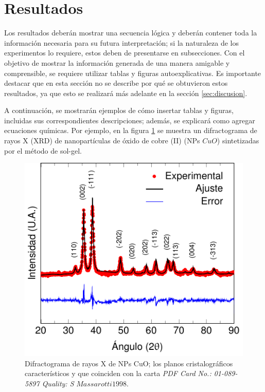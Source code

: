 \documentclass[fleqn,10pt]{SelfArx} %
\begin{document}
\section{Resultados} %
\label{sec:resultados} %

Los resultados deberán mostrar una secuencia lógica y deberán contener toda la información necesaria para su futura interpretación; si la naturaleza de los experimentos lo requiere, estos deben de presentarse en subsecciones. Con el objetivo de mostrar la información generada de una manera amigable y comprensible, se requiere utilizar tablas y figuras autoexplicativas. Es importante destacar que en esta sección no se describe por qué se obtuvieron estos resultados, ya que esto se realizará más adelante en la sección \ref{sec:discusion}.

A continuación, se mostrarán ejemplos de cómo insertar tablas y figuras, incluidas sus correspondientes descripciones; además, se explicará como agregar ecuaciones químicas. Por ejemplo, en la figura \ref{fig:xrd} se muestra un difractograma de rayos X (XRD) de nanopartículas de óxido de cobre (II) (NPs $CuO$) sintetizadas por el método de sol-gel.

\begin{figure}[ht!]
    \centering
    \includegraphics[width=\linewidth]{figuras/xrd.pdf}
    \caption{Difractograma de rayos X de NPs CuO; los planos cristalográficos característicos y que coinciden con la carta \textit{PDF Card No.: 01-089-5897 Quality: S} $Massarotti1998$.}
    \label{fig:xrd}
\end{figure}
\end{document}
